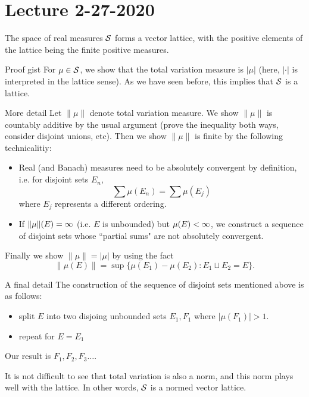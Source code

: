 \section{Lecture 2-27-2020}
\begin{thm}
The space of real measures ${\mathcal S}$ forms a vector lattice, with the positive elements of the lattice being the finite positive measures.
\end{thm}

\begin{details}{Proof gist}
For $\mu \in {\mathcal S}$, we show that the total variation measure is $|\mu|$ (here, $| \cdot |$ is interpreted in the lattice sense). As we have seen before, this implies that ${\mathcal S}$ is a lattice.
\end{details}
\begin{details}{More detail}
Let $\|\mu\|$ denote total variation measure. We show $\|\mu\|$ is countably additive by the usual argument (prove the inequality both ways, consider disjoint unions, etc). Then we show $\|\mu\|$ is finite by the following technicalitiy:
\begin{itemize}
    \item Real (and Banach) measures need to be absolutely convergent by definition, i.e. for disjoint sets $E_n$,
        \[
            \sum \mu(E_n) = \sum \mu(E_j)
        \]
        where $E_j$ represents a different ordering.

    \item If $\|\mu\|(E) = \infty$ (i.e. $E$ is unbounded) but $\mu(E) < \infty$, we construct a sequence of disjoint sets whose ``partial sums" are not absolutely convergent.
\end{itemize}
Finally we show $\|\mu\| = |\mu|$ by using the fact
\[
    \|\mu(E)\| = \sup\{ \mu(E_1) - \mu(E_2): E_1 \sqcup E_2 = E\}.
\]
\end{details}

\begin{details}{A final detail}
The construction of the sequence of disjoint sets mentioned above is as follows:
\begin{itemize}
    \item split $E$ into two disjoing unbounded sets $E_1, F_1$ where $|\mu(F_1)| > 1$.
    \item repeat for $E = E_1$
\end{itemize}
Our result is $F_1, F_2, F_3 \dots$.
\end{details}

\begin{remark}
It is not difficult to see that total variation is also a norm, and this norm plays well with the lattice. In other words, ${\mathcal S}$ is a normed vector lattice.
\end{remark}
